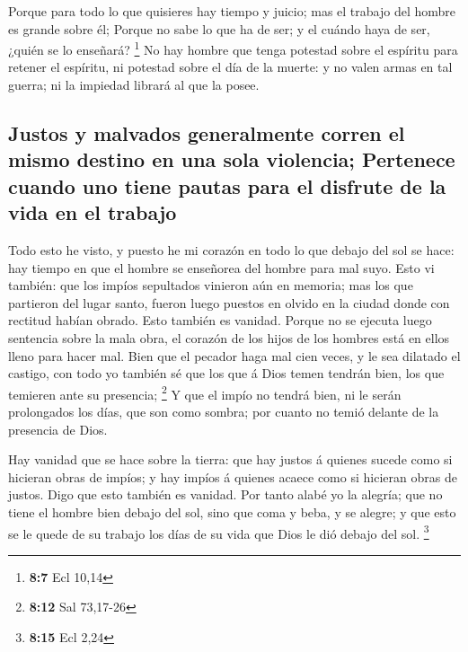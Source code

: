  Porque para todo lo que quisieres hay tiempo y juicio; mas
el trabajo del hombre es grande sobre él;  Porque no sabe lo
que ha de ser; y el cuándo haya de ser, ¿quién se lo enseñará?
\footnote{\textbf{8:7} Ecl 10,14}  No hay hombre que tenga
potestad sobre el espíritu para retener el espíritu, ni potestad sobre
el día de la muerte: y no valen armas en tal guerra; ni la impiedad
librará al que la posee.

\hypertarget{justos-y-malvados-generalmente-corren-el-mismo-destino-en-una-sola-violencia-pertenece-cuando-uno-tiene-pautas-para-el-disfrute-de-la-vida-en-el-trabajo}{%
\subsection{Justos y malvados generalmente corren el mismo destino en
una sola violencia; Pertenece cuando uno tiene pautas para el disfrute
de la vida en el
trabajo}\label{justos-y-malvados-generalmente-corren-el-mismo-destino-en-una-sola-violencia-pertenece-cuando-uno-tiene-pautas-para-el-disfrute-de-la-vida-en-el-trabajo}}

 Todo esto he visto, y puesto he mi corazón en todo lo que
debajo del sol se hace: hay tiempo en que el hombre se enseñorea del
hombre para mal suyo.  Esto vi también: que los impíos
sepultados vinieron aún en memoria; mas los que partieron del lugar
santo, fueron luego puestos en olvido en la ciudad donde con rectitud
habían obrado. Esto también es vanidad.  Porque no se
ejecuta luego sentencia sobre la mala obra, el corazón de los hijos de
los hombres está en ellos lleno para hacer mal.  Bien que
el pecador haga mal cien veces, y le sea dilatado el castigo, con todo
yo también sé que los que á Dios temen tendrán bien, los que temieren
ante su presencia; \footnote{\textbf{8:12} Sal 73,17-26}  Y
que el impío no tendrá bien, ni le serán prolongados los días, que son
como sombra; por cuanto no temió delante de la presencia de Dios.

 Hay vanidad que se hace sobre la tierra: que hay justos á
quienes sucede como si hicieran obras de impíos; y hay impíos á quienes
acaece como si hicieran obras de justos. Digo que esto también es
vanidad.  Por tanto alabé yo la alegría; que no tiene el
hombre bien debajo del sol, sino que coma y beba, y se alegre; y que
esto se le quede de su trabajo los días de su vida que Dios le dió
debajo del sol. \footnote{\textbf{8:15} Ecl 2,24}

